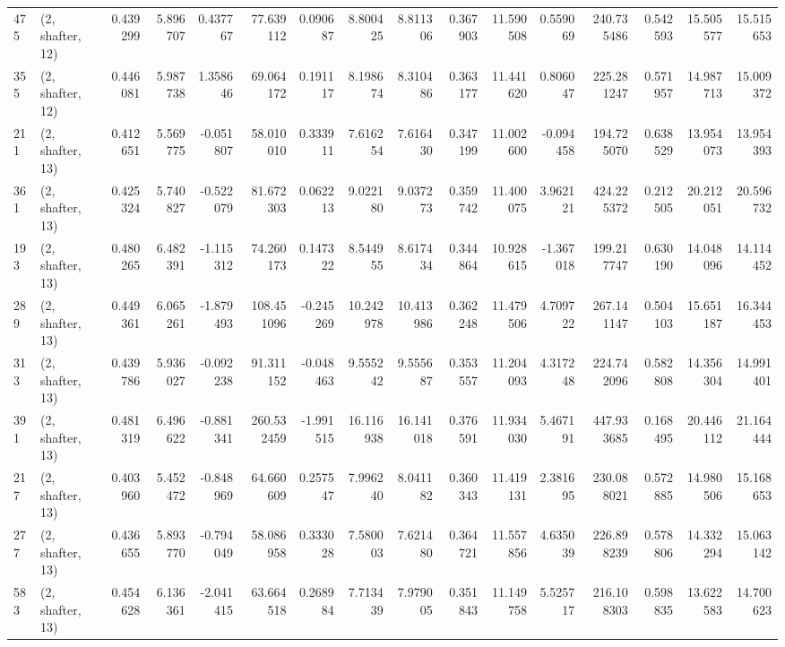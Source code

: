 \begin{tabular}{llrrrrrrrrrrrrrr}
475 &  (2, shafter, 12) &   0.439299 &   5.896707 &   0.437767 &    77.639112 &   0.090687 &   8.800425 &   8.811306 &  0.367903 &  11.590508 &   0.559069 &    240.735486 &   0.542593 &  15.505577 &   15.515653 \\
355 &  (2, shafter, 12) &   0.446081 &   5.987738 &   1.358646 &    69.064172 &   0.191117 &   8.198674 &   8.310486 &  0.363177 &  11.441620 &   0.806047 &    225.281247 &   0.571957 &  14.987713 &   15.009372 \\
211 &  (2, shafter, 13) &   0.412651 &   5.569775 &  -0.051807 &    58.010010 &   0.333911 &   7.616254 &   7.616430 &  0.347199 &  11.002600 &  -0.094458 &    194.725070 &   0.638529 &  13.954073 &   13.954393 \\
361 &  (2, shafter, 13) &   0.425324 &   5.740827 &  -0.522079 &    81.672303 &   0.062213 &   9.022180 &   9.037273 &  0.359742 &  11.400075 &   3.962121 &    424.225372 &   0.212505 &  20.212051 &   20.596732 \\
193 &  (2, shafter, 13) &   0.480265 &   6.482391 &  -1.115312 &    74.260173 &   0.147322 &   8.544955 &   8.617434 &  0.344864 &  10.928615 &  -1.367018 &    199.217747 &   0.630190 &  14.048096 &   14.114452 \\
289 &  (2, shafter, 13) &   0.449361 &   6.065261 &  -1.879493 &   108.451096 &  -0.245269 &  10.242978 &  10.413986 &  0.362248 &  11.479506 &   4.709722 &    267.141147 &   0.504103 &  15.651187 &   16.344453 \\
313 &  (2, shafter, 13) &   0.439786 &   5.936027 &  -0.092238 &    91.311152 &  -0.048463 &   9.555242 &   9.555687 &  0.353557 &  11.204093 &   4.317248 &    224.742096 &   0.582808 &  14.356304 &   14.991401 \\
391 &  (2, shafter, 13) &   0.481319 &   6.496622 &  -0.881341 &   260.532459 &  -1.991515 &  16.116938 &  16.141018 &  0.376591 &  11.934030 &   5.467191 &    447.933685 &   0.168495 &  20.446112 &   21.164444 \\
217 &  (2, shafter, 13) &   0.403960 &   5.452472 &  -0.848969 &    64.660609 &   0.257547 &   7.996240 &   8.041182 &  0.360343 &  11.419131 &   2.381695 &    230.088021 &   0.572885 &  14.980506 &   15.168653 \\
277 &  (2, shafter, 13) &   0.436655 &   5.893770 &  -0.794049 &    58.086958 &   0.333028 &   7.580003 &   7.621480 &  0.364721 &  11.557856 &   4.635039 &    226.898239 &   0.578806 &  14.332294 &   15.063142 \\
583 &  (2, shafter, 13) &   0.454628 &   6.136361 &  -2.041415 &    63.664518 &   0.268984 &   7.713439 &   7.979005 &  0.351843 &  11.149758 &   5.525717 &    216.108303 &   0.598835 &  13.622583 &   14.700623 \\

\end{tabular}
